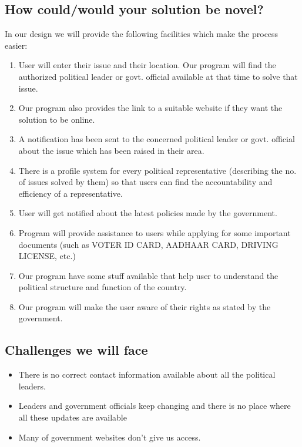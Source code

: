 \documentclass[acmtog]{acmart}
\begin{document}
\subsection{How could/would your solution be novel?}
In our design we will provide the following facilities which make the process easier:
\begin{enumerate}
    \item User will enter their issue and their location. Our program will find the authorized political leader or govt. official available at that time to solve that issue.
    \item Our program also provides the link to a suitable website if they want the solution to be online.
    \item A notification has been sent to the concerned political leader or govt. official about the issue which has been raised in their area.
    \item There is a profile system for every political representative (describing the no. of issues solved by them) so that users can find the accountability and efficiency of a representative.
    \item  User will get notified about the latest policies made by the government.
    \item Program will provide assistance to users while applying for some important documents (such as VOTER ID CARD, AADHAAR CARD, DRIVING LICENSE, etc.) 
    \item Our program have some stuff available that help user to understand the political structure and function of the country.
    \item Our program will make the user aware of their rights as stated by the government.
\end{enumerate}

\subsection{Challenges we will face}
\begin{itemize}
    \item There is no correct contact information available about all the political leaders.
    \item Leaders and government officials keep changing and there is no place where all these updates are available
    \item Many of government websites don’t give us access.
\end{itemize}
\end{document}
